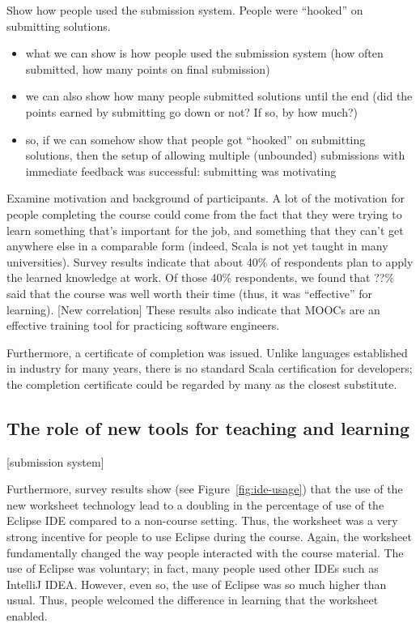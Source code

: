 \documentclass{sig-alternate}
\begin{document}
Show how people used the submission system. People were ``hooked'' on submitting solutions.

\begin{itemize}

\item what we can show is how people used the submission system (how often submitted, how
  many points on final submission)

\item we can also show how many people submitted solutions until the end (did the points
  earned by submitting go down or not? If so, by how much?)

\item so, if we can somehow show that people got ``hooked'' on submitting solutions, then
  the setup of allowing multiple (unbounded) submissions with immediate feedback was
  successful: submitting was motivating

\end{itemize}

Examine motivation and background of participants. A lot of the motivation for
people completing the course could come from the fact that they were trying to
learn something that's important for the job, and something that they can't
get anywhere else in a comparable form (indeed, Scala is not yet taught in
many universities). Survey results indicate that about 40\% of respondents
plan to apply the learned knowledge at work. Of those 40\% respondents, we
found that ??\% said that the course was well worth their time (thus, it was
``effective'' for learning). [New correlation] These results also indicate
that MOOCs are an effective training tool for practicing software engineers.

Furthermore, a certificate of completion was issued. Unlike languages
established in industry for many years, there is no standard Scala
certification for developers; the completion certificate could be regarded by
many as the closest substitute.

\subsection{The role of new tools for teaching and learning}

[submission system]

Furthermore, survey results show (see Figure~\ref{fig:ide-usage}) that the use
of the new worksheet technology lead to a doubling in the percentage of use of
the Eclipse IDE compared to a non-course setting. Thus, the worksheet was a
very strong incentive for people to use Eclipse during the course. Again, the
worksheet fundamentally changed the way people interacted with the course
material. The use of Eclipse was voluntary; in fact, many people used other
IDEs such as IntelliJ IDEA. However, even so, the use of Eclipse was so much
higher than usual. Thus, people welcomed the difference in learning that the
worksheet enabled.
\end{document}
